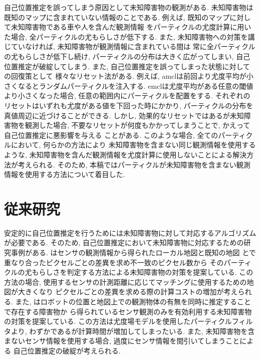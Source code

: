 自己位置推定を誤ってしまう原因として未知障害物の観測がある. 
未知障害物は既知のマップに含まれていない情報のことである. 
例えば, 既知のマップに対して未知障害物である車や人を含んだ観測情報
をパーティクルの尤度計算に用いた場合, 全パーティクルの尤もらしさが低下する. 
また, 未知障害物への対策を講じていなければ, 未知障害物が観測情報に含まれている間は
常に全パーティクルの尤もらしさが低下し続け, パーティクルの分布は大きく広がってしまい, 
自己位置推定が破綻してしまう. また, 自己位置推定を誤ってしまった状態に対しての回復策として
様々なリセット法がある. 
例えば, amclは前回より尤度平均が小さくなるとランダムパーティクルを注入する. 
emclは尤度平均がある任意の閾値より小さくなった場合, 
任意の範囲内にパーティクルを配置をする\cite{ueda2004iros}. 
それぞれのリセットはいずれも尤度がある値を下回った時にかかり, 
パーティクルの分布を真値周辺に近づけることができる. 
しかし, 効果的なリセットではあるが未知障害物を観測した場合, 
不要なリセットが何度もかかってしまうことで, かえって自己位置推定に悪影響を与える
ことがある. 
このような場合, 全てのパーティクルにおいて, 何らかの方法により
未知障害物を含まない同じ観測情報を使用するような, 
未知障害物を含んだ観測情報を尤度計算に使用しないことによる解決方法が考えられる. 
そのため, 本稿ではパーティクルが未知障害物を含まない観測情報を使用する方法について着目した. 


\section{従来研究}

安定的に自己位置推定を行うためには未知障害物に対して対応するアルゴリズムが必要である.
そのため, 自己位置推定において未知障害物に対応するための研究事例\cite{富沢2012}\cite{赤井2019}がある. 
\cite{富沢2012}はセンサの観測情報から得られたローカル地図と既知の地図
とで重なり合ったピクセルごとの差異を求め不一致のピクセル数から
そのパーティクルの尤もらしさを判定する方法による未知障害物の対策を提案している. 
この方法の場合, 使用するセンサの計測距離に応じてマッチングに使用するための地図が大きくなり
ピクセルごとの差異を求める際の計算コストの増加が考えられる. 
また, \cite{赤井2019}はロボットの位置と地図上での観測物体の有無を同時に推定することで存在する障害物か
ら得られているセンサ観測のみを有効利用する未知障害物の対策を提案している. 
この方法は尤度場モデルを使用したパーティクルフィルタより, わずかであるが計算時間が増加してしまったいる. 
また, 未知障害物を含まないセンサ情報を使用する場合, 過度にセンサ情報を間引いてしまうことによる
自己位置推定の破綻が考えられる. 

